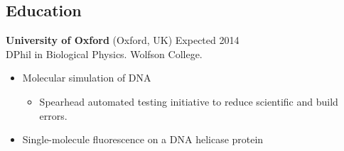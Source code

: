 \documentclass[margin]{res}
\newcommand{\locdatesubsection}[3]{\textbf{#1} (#2) \hfill #3}
\begin{document}
 
\begin{sloppypar}
 
 

\address{2115 Cloville Avenue\\
         Baltimore, MD 21214\\
         \texttt{+}1 443 257 5953}
\address{\texttt{ryan.m.harrison@gmail.com}\\
         \texttt{linkedin.com/in/rmharri}\\
         \texttt{github.com/rmharrison}}
\address{Wolfson College\\ 
         Oxford OX2 6UD\\
         \texttt{+}44 07523 229446}

\begin{resume} 
\setlength{\parskip}{1.00ex}
\setlength{\parindent}{0pt}
 
\section{Education} 
\locdatesubsection{University of Oxford}{Oxford, UK}{Expected 2014}\\
DPhil in Biological Physics. Wolfson College.

\begin{itemize}
\item Molecular simulation of DNA
    \begin{itemize}
    \item Spearhead automated testing initiative to reduce scientific and build errors.
    \end{itemize}
\item Single-molecule fluorescence on a DNA helicase protein
\end{itemize}


\end{resume}
\end{sloppypar}
\end{document}

